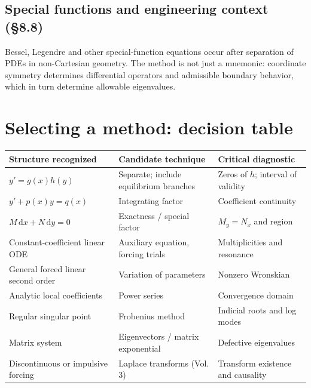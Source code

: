 \documentclass[11pt,letterpaper,oneside]{report}
\theoremstyle{definition}\newtheorem{definition}[theorem]{Definition}
\theoremstyle{remark}\newtheorem{remark}[theorem]{Remark}
\newcommand{\dd}{\,\mathrm{d}}
\begin{document}
\section{Special functions and engineering context (\S8.8)}
Bessel, Legendre and other special-function equations occur after separation of PDEs in non-Cartesian geometry. The method is not just a mnemonic: coordinate symmetry determines differential operators and admissible boundary behavior, which in turn determine allowable eigenvalues.
\chapter{Selecting a method: decision table}
\begin{longtable}{p{}p{}p{}}
\toprule Structure recognized & Candidate technique & Critical diagnostic \\ \midrule\endhead
$y'=g(x)h(y)$ & Separate; include equilibrium branches & Zeros of $h$; interval of validity \\
$y'+p(x)y=q(x)$ & Integrating factor & Coefficient continuity \\
$M\dd x+N\dd y=0$ & Exactness / special factor & $M_y=N_x$ and region \\
Constant-coefficient linear ODE & Auxiliary equation, forcing trials & Multiplicities and resonance \\
General forced linear second order & Variation of parameters & Nonzero Wronskian \\
Analytic local coefficients & Power series & Convergence domain \\
Regular singular point & Frobenius method & Indicial roots and log modes \\
Matrix system & Eigenvectors / matrix exponential & Defective eigenvalues \\
Discontinuous or impulsive forcing & Laplace transforms (Vol. 3) & Transform existence and causality \\
\bottomrule
\end{longtable}
\end{document}
